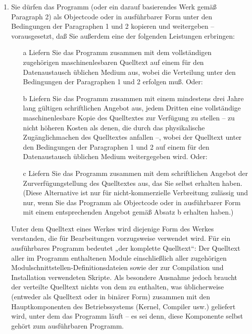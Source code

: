 {\begin{enumerate}
Somit ist es nicht die Absicht dieses Abschnittes, Rechte für Werke in Anspruch zu nehmen oder Ihnen die Rechte für Werke streitig zu machen, die komplett von Ihnen geschrieben wurden; vielmehr ist es die Absicht, die Rechte zur Kontrolle der Verbreitung von Werken, die auf dem Programm basieren oder unter seiner auszugsweisen Verwendung zusammengestellt worden sind, auszuüben.

Ferner bringt auch das einfache Zusammenlegen eines anderen Werkes, das nicht auf dem Programm basiert, mit dem Programm oder einem auf dem Programm basierenden Werk auf ein- und demselben Speicher- oder Vertriebsmedium dieses andere Werk nicht in den Anwendungsbereich dieser Lizenz.

\item Sie dürfen das Programm (oder ein darauf basierendes Werk gemäß Paragraph 2) als Objectcode oder in ausführbarer Form unter den Bedingungen der Paragraphen 1 und 2 kopieren und weitergeben – vorausgesetzt, daß Sie außerdem eine der folgenden Leistungen erbringen:
\begin{itemize}
    \item[a] Liefern Sie das Programm zusammen mit dem vollständigen zugehörigen maschinenlesbaren Quelltext auf einem für den Datenaustausch üblichen Medium aus, wobei die Verteilung unter den Bedingungen der Paragraphen 1 und 2 erfolgen muß. Oder:
    \item[b]Liefern Sie das Programm zusammen mit einem mindestens drei Jahre lang gültigen schriftlichen Angebot aus, jedem Dritten eine vollständige maschinenlesbare Kopie des Quelltextes zur Verfügung zu stellen – zu nicht höheren Kosten als denen, die durch das physikalische Zugänglichmachen des Quelltextes anfallen –, wobei der Quelltext unter den Bedingungen der Paragraphen 1 und 2 auf einem für den Datenaustausch üblichen Medium weitergegeben wird. Oder:
    \item[c]Liefern Sie das Programm zusammen mit dem schriftlichen Angebot der Zurverfügungstellung des Quelltextes aus, das Sie selbst erhalten haben. (Diese Alternative ist nur für nicht-kommerzielle Verbreitung zulässig und nur, wenn Sie das Programm als Objectcode oder in ausführbarer Form mit einem entsprechenden Angebot gemäß Absatz b erhalten haben.)
\end{itemize}
Unter dem Quelltext eines Werkes wird diejenige Form des Werkes verstanden, die für Bearbeitungen vorzugsweise verwendet wird. Für ein ausführbares Programm bedeutet „der komplette Quelltext“: Der Quelltext aller im Programm enthaltenen Module einschließlich aller zugehörigen Modulschnittstellen-Definitionsdateien sowie der zur Compilation und Installation verwendeten Skripte. Als besondere Ausnahme jedoch braucht der verteilte Quelltext nichts von dem zu enthalten, was üblicherweise (entweder als Quelltext oder in binärer Form) zusammen mit den Hauptkomponenten des Betriebssystems (Kernel, Compiler usw.) geliefert wird, unter dem das Programm läuft – es sei denn, diese Komponente selbst gehört zum ausführbaren Programm.


\end{enumerate}}
